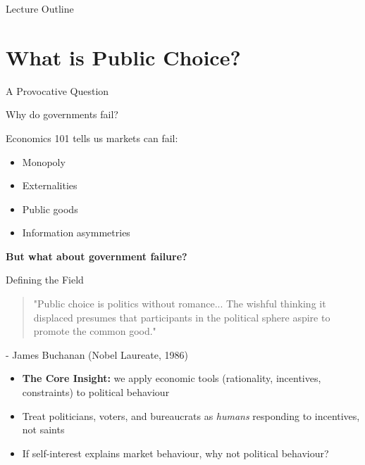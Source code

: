 \documentclass[10pt]{beamer}
\begin{document}
\begin{frame}{Lecture Outline}
\tableofcontents
\end{frame}

\section{What is Public Choice?}

\begin{frame}{A Provocative Question}
\begin{center}
\Large Why do governments fail?
\end{center}

\pause
\vspace{1cm}

Economics 101 tells us markets can fail:
\begin{itemize}
\item Monopoly
\item Externalities
\item Public goods
\item Information asymmetries
\end{itemize}

\pause
\textbf{But what about government failure?}
\end{frame}

\begin{frame}{Defining the Field}
\begin{quote}
"Public choice is politics without romance... The wishful thinking it displaced presumes that participants in the political sphere aspire to promote the common good."
\end{quote}
\begin{flushright}
- James Buchanan (Nobel Laureate, 1986)
\end{flushright}

\pause
\vspace{0.5cm}
\begin{itemize}
\item \textbf{The Core Insight:} we apply economic tools (rationality, incentives, constraints) to political behaviour
\item Treat politicians, voters, and bureaucrats as \textit{humans} responding to incentives, not saints
\item If self-interest explains market behaviour, why not political behaviour?
\end{itemize}
\end{frame}
\end{document}
